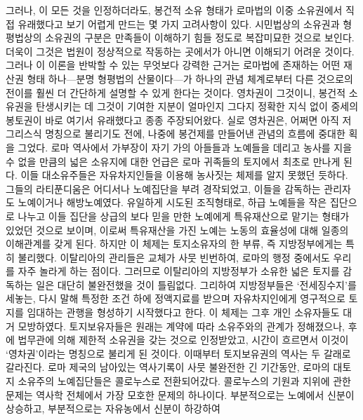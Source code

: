 그러나,
이 모든 것을 인정하더라도,
봉건적 소유 형태가 로마법의 이중 소유권에서 직접
유래했다고 보기 어렵게 만드는 몇 가지 고려사항이 있다.
시민법상의 소유권과 형평법상의 소유권의 구분은
만족들이 이해하기 힘들 정도로 복잡미묘한 것으로 보인다.
더욱이 그것은 법원이 정상적으로 작동하는 곳에서가 아니면 이해되기 어려운 것이다.
그러나 이 이론을 반박할 수 있는 무엇보다 강력한 근거는
로마법에 존재하는 어떤 재산권 형태 하나---분명 형평법의 산물이다---가
하나의 관념 체계로부터 다른 것으로의 전이를 훨씬 더
간단하게 설명할 수 있게 한다는 것이다.
영차권이 그것이니,
봉건적 소유권을 탄생시키는 데
그것이 기여한 지분이 얼마인지 그다지 정확한 지식 없이
중세의 봉토권이 바로 여기서 유래했다고
종종
주장되어왔다.
실로
영차권은,
어쩌면 아직 저 그리스식 명칭으로 불리기도 전에,
나중에 봉건제를 만들어낸 관념의 흐름에 중대한 획을 그었다.
로마 역사에서
가부장이 자기 가의 아들들과 노예들을 데리고
농사를 지을 수 없을 만큼의 넓은 소유지에 대한 언급은
로마 귀족들의 토지에서 최초로 만나게 된다.
이들 대소유주들은
자유차지인들을 이용해 농사짓는 체제를 알지 못했던 듯하다.
그들의 라티푼디움은 어디서나
노예집단을 부려 경작되었고,
이들을 감독하는 관리자도 노예이거나 해방노예였다.
유일하게 시도된 조직형태로,
하급 노예들을 작은 집단으로 나누고
이들 집단을 상급의 보다 믿을 만한 노예에게
특유재산으로 맡기는
형태가 있었던 것으로 보이며,
이로써 특유재산을 가진 노예는 노동의 효율성에 대해
일종의 이해관계를 갖게 된다.
하지만 이 체제는 토지소유자의 한 부류, 즉
지방정부에게는
특히 불리했다.
이탈리아의 관리들은 교체가 사뭇 빈번하여,
로마의 행정 중에서도 우리를 자주 놀라게 하는 점이다.
그러므로 이탈리아의 지방정부가 소유한 넓은 토지를
감독하는 일은 대단히 불완전했을 것이 틀림없다.
그리하여 지방정부들은
`전세징수지'를 세놓는,
다시 말해 특정한 조건 하에
정액지료를 받으며
자유차지인에게
영구적으로
토지를
임대하는
관행을 형성하기 시작했다고 한다.
이 체제는 그후 개인 소유자들도 대거 모방하였다.
토지보유자들은
원래는 계약에 따라
소유주와의 관계가
정해졌으나, 후에
법무관에 의해 제한적 소유권을 갖는 것으로 인정받았고,
시간이 흐르면서 이것이 `영차권'이라는 명칭으로 불리게 된 것이다.
이때부터
토지보유권의 역사는 두 갈래로 갈라진다.
로마 제국의 남아있는 역사기록이 사뭇 불완전한 긴 기간동안,
로마의 대토지 소유주의 노예집단들은
콜로누스로 전환되어갔다.
콜로누스의 기원과 지위에 관한 문제는
역사학 전체에서 가장 모호한 문제의 하나이다.
부분적으로는 노예에서 신분이 상승하고,
부분적으로는 자유농에서 신분이 하강하여
